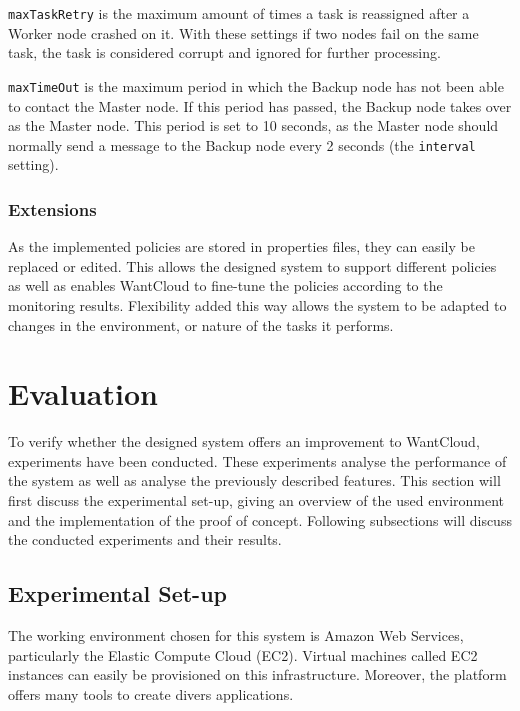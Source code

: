\documentclass{acm_proc_article-sp}
\begin{document}
\texttt{maxTaskRetry} is the maximum amount of times a task is reassigned after a Worker node crashed on it.
With these settings if two nodes fail on the same task, the task is considered corrupt and ignored for further processing.

\texttt{maxTimeOut} is the maximum period in which the Backup node has not been able to contact the Master node.
If this period has passed, the Backup node takes over as the Master node.
This period is set to 10 seconds, as the Master node should normally send a message to the Backup node every 2 seconds (the \texttt{interval} setting).

\subsubsection{Extensions}
As the implemented policies are stored in properties files, they can easily be replaced or edited.
This allows the designed system to support different policies as well as enables WantCloud to fine-tune the policies according to the monitoring results.
Flexibility added this way allows the system to be adapted to changes in the environment, or nature of the tasks it performs.

\section{Evaluation}
\label{sec:eval}
To verify whether the designed system offers an improvement to WantCloud, experiments have been conducted.
These experiments analyse the performance of the system as well as analyse the previously described features.
This section will first discuss the experimental set-up, giving an overview of the used environment and the implementation of the proof of concept.
Following subsections will discuss the conducted experiments and their results.

\subsection{Experimental Set-up}
The working environment chosen for this system is Amazon Web Services\cite{web:aws}, particularly the Elastic Compute Cloud (EC2)\cite{web:ec2}.
Virtual machines called EC2 instances can easily be provisioned on this infrastructure.
Moreover, the platform offers many tools to create divers applications.
\end{document}
